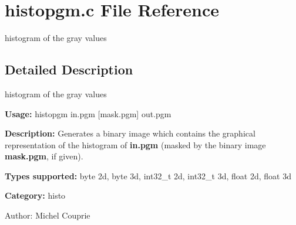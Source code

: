 \section{histopgm.c File Reference}
\label{histopgm_8c}
histogram of the gray values  




\label{_details}
\subsection{Detailed Description}
histogram of the gray values 

{\bf Usage:} histopgm in.pgm [mask.pgm] out.pgm

{\bf Description:} Generates a binary image which contains the graphical representation of the histogram of {\bf in.pgm} (masked by the binary image {\bf mask.pgm}, if given).

{\bf Types supported:} byte 2d, byte 3d, int32\_\-t 2d, int32\_\-t 3d, float 2d, float 3d

{\bf Category:} histo

\begin{Desc}
\item[Author:]Michel Couprie \end{Desc}
